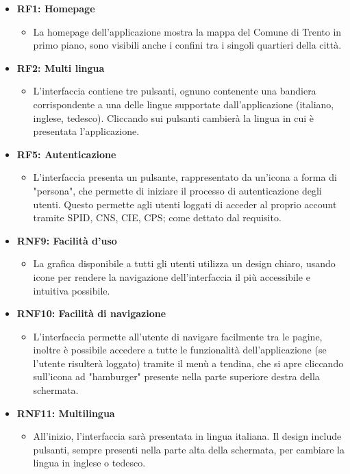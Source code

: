     \begin{itemize}
        \item \textbf{RF1: Homepage} \begin{itemize}
            \item La homepage dell'applicazione mostra la mappa del Comune di Trento in primo piano, sono visibili anche i confini tra i singoli quartieri della città.
        \end{itemize}
        \item \textbf{RF2: Multi lingua} \begin{itemize} 
                \item L'interfaccia contiene tre pulsanti, ognuno contenente una bandiera corrispondente a una delle lingue supportate dall'applicazione (italiano, inglese, tedesco). Cliccando sui pulsanti cambierà la lingua in cui è presentata l'applicazione.
        \end{itemize}
        \item \textbf{RF5: Autenticazione} \begin{itemize} 
            \item L'interfaccia presenta un pulsante, rappresentato da un'icona a forma di "persona", che permette di iniziare il processo di autenticazione degli utenti. Questo permette agli utenti loggati di acceder al proprio account tramite SPID, CNS, CIE, CPS; come dettato dal requisito.
        \end{itemize}
        \item \textbf{RNF9: Facilità d’uso} \begin{itemize}
                \item La grafica disponibile a tutti gli utenti utilizza un design chiaro, usando icone per rendere la navigazione dell'interfaccia il più accessibile e intuitiva possibile. 
        \end{itemize}
        \item \textbf{RNF10: Facilità di navigazione} \begin{itemize}
            \item L'interfaccia permette all'utente di navigare facilmente tra le pagine, inoltre è possibile accedere a tutte le funzionalità dell'applicazione (se l'utente risulterà loggato) tramite il menù a tendina, che si apre cliccando sull'icona ad "hamburger" presente nella parte superiore destra della schermata.
        \end{itemize}
        \item \textbf{RNF11: Multilingua} \begin{itemize} 
            \item All'inizio, l'interfaccia sarà presentata in lingua italiana. Il design include pulsanti, sempre presenti nella parte alta della schermata, per cambiare la lingua in inglese o tedesco.
        \end{itemize}
    \end{itemize}


